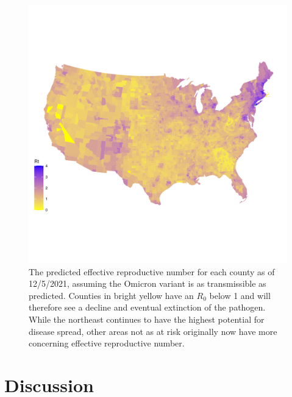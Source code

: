 \documentclass[
  12pt,
]{article}
\begin{document}
\begin{figure}[H]

{\centering \includegraphics{Final-Manuscript_files/figure-latex/fig6-1} 

}

\caption{The predicted effective reproductive number for each county as of 12/5/2021, assuming the Omicron variant is as transmissible as predicted. Counties in bright yellow have an \(R_0\) below 1 and will therefore see a decline and eventual extinction of the pathogen. While the northeast continues to have the highest potential for disease spread, other areas not as at risk originally now have more concerning effective reproductive number.}\label{fig:fig6}
\end{figure}

\hypertarget{discussion}{%
\section{Discussion}\label{discussion}}
\end{document}
